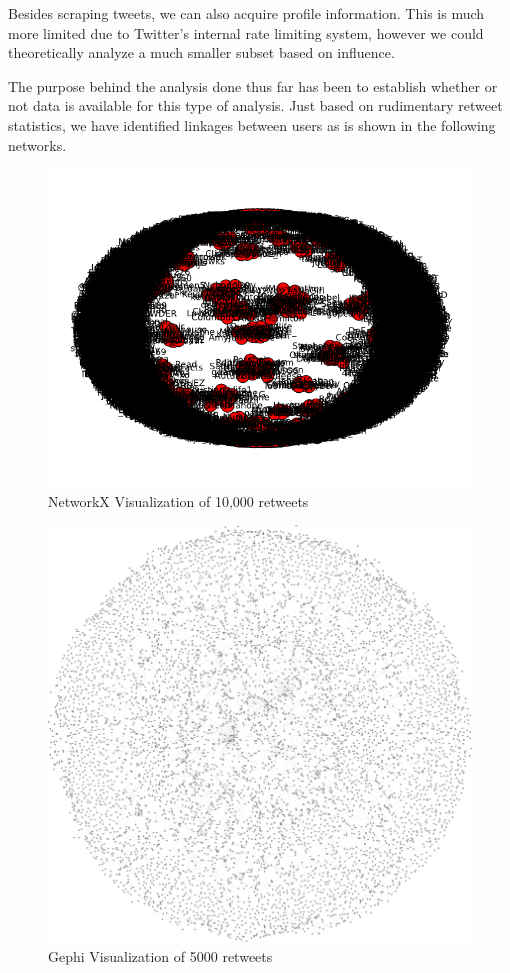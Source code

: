 \documentclass[10pt]{article}
\begin{document}
Besides scraping tweets, we can also acquire profile information. This is much more limited due to Twitter's internal rate limiting system, however we could theoretically analyze a much smaller subset based on influence.

The purpose behind the analysis done thus far has been to establish whether or not data is available for this type of analysis. Just based on rudimentary retweet statistics, we have identified linkages between users as is shown in the following networks.

\begin{figure}[ht]
    \centering
    \includegraphics[scale=0.5]{./img/network.png}
    \caption{NetworkX Visualization of 10,000 retweets}
\end{figure}

\begin{figure}[ht]
    \centering
    \includegraphics[scale=0.25]{./img/5000.png}
    \caption{Gephi Visualization of 5000 retweets}
\end{figure}
\end{document}
